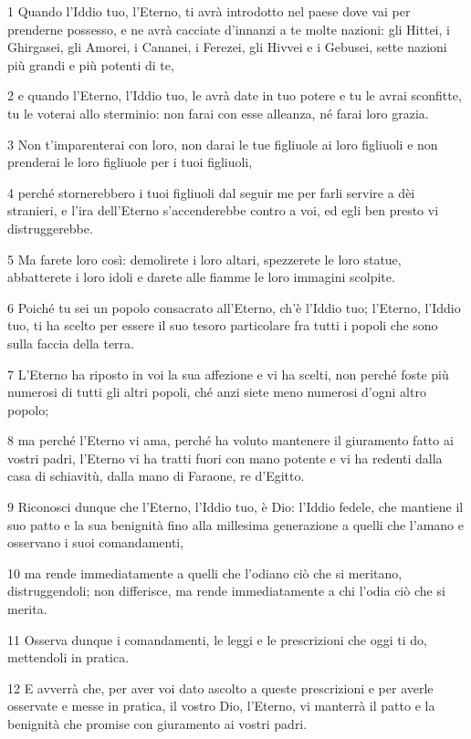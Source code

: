 \par 1 Quando l'Iddio tuo, l'Eterno, ti avrà introdotto nel paese dove vai per prenderne possesso, e ne avrà cacciate d'innanzi a te molte nazioni: gli Hittei, i Ghirgasei, gli Amorei, i Cananei, i Ferezei, gli Hivvei e i Gebusei, sette nazioni più grandi e più potenti di te,
\par 2 e quando l'Eterno, l'Iddio tuo, le avrà date in tuo potere e tu le avrai sconfitte, tu le voterai allo sterminio: non farai con esse alleanza, né farai loro grazia.
\par 3 Non t'imparenterai con loro, non darai le tue figliuole ai loro figliuoli e non prenderai le loro figliuole per i tuoi figliuoli,
\par 4 perché stornerebbero i tuoi figliuoli dal seguir me per farli servire a dèi stranieri, e l'ira dell'Eterno s'accenderebbe contro a voi, ed egli ben presto vi distruggerebbe.
\par 5 Ma farete loro così: demolirete i loro altari, spezzerete le loro statue, abbatterete i loro idoli e darete alle fiamme le loro immagini scolpite.
\par 6 Poiché tu sei un popolo consacrato all'Eterno, ch'è l'Iddio tuo; l'Eterno, l'Iddio tuo, ti ha scelto per essere il suo tesoro particolare fra tutti i popoli che sono sulla faccia della terra.
\par 7 L'Eterno ha riposto in voi la sua affezione e vi ha scelti, non perché foste più numerosi di tutti gli altri popoli, ché anzi siete meno numerosi d'ogni altro popolo;
\par 8 ma perché l'Eterno vi ama, perché ha voluto mantenere il giuramento fatto ai vostri padri, l'Eterno vi ha tratti fuori con mano potente e vi ha redenti dalla casa di schiavitù, dalla mano di Faraone, re d'Egitto.
\par 9 Riconosci dunque che l'Eterno, l'Iddio tuo, è Dio: l'Iddio fedele, che mantiene il suo patto e la sua benignità fino alla millesima generazione a quelli che l'amano e osservano i suoi comandamenti,
\par 10 ma rende immediatamente a quelli che l'odiano ciò che si meritano, distruggendoli; non differisce, ma rende immediatamente a chi l'odia ciò che si merita.
\par 11 Osserva dunque i comandamenti, le leggi e le prescrizioni che oggi ti do, mettendoli in pratica.
\par 12 E avverrà che, per aver voi dato ascolto a queste prescrizioni e per averle osservate e messe in pratica, il vostro Dio, l'Eterno, vi manterrà il patto e la benignità che promise con giuramento ai vostri padri.
